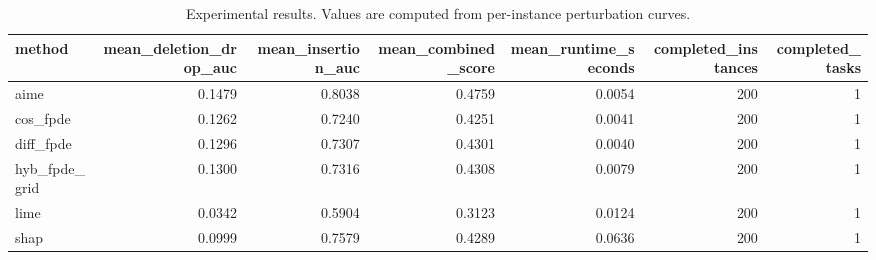 \begin{table}[t]
\caption{Experimental results. Values are computed from per-instance perturbation curves.}
\label{tab:main_results_computed}
\centering
\begin{tabular}{lrrrrrr}
\toprule
method & mean\_deletion\_drop\_auc & mean\_insertion\_auc & mean\_combined\_score & mean\_runtime\_seconds & completed\_instances & completed\_tasks \\
\midrule
aime & 0.1479 & 0.8038 & 0.4759 & 0.0054 & 200 & 1 \\
cos\_fpde & 0.1262 & 0.7240 & 0.4251 & 0.0041 & 200 & 1 \\
diff\_fpde & 0.1296 & 0.7307 & 0.4301 & 0.0040 & 200 & 1 \\
hyb\_fpde\_grid & 0.1300 & 0.7316 & 0.4308 & 0.0079 & 200 & 1 \\
lime & 0.0342 & 0.5904 & 0.3123 & 0.0124 & 200 & 1 \\
shap & 0.0999 & 0.7579 & 0.4289 & 0.0636 & 200 & 1 \\
\bottomrule
\end{tabular}

\end{table}
